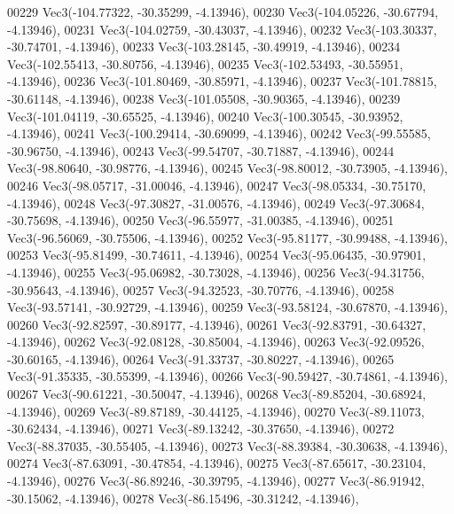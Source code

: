 \begin{DoxyCode}
00229         Vec3(-104.77322, -30.35299, -4.13946),
00230         Vec3(-104.05226, -30.67794, -4.13946),
00231         Vec3(-104.02759, -30.43037, -4.13946),
00232         Vec3(-103.30337, -30.74701, -4.13946),
00233         Vec3(-103.28145, -30.49919, -4.13946),
00234         Vec3(-102.55413, -30.80756, -4.13946),
00235         Vec3(-102.53493, -30.55951, -4.13946),
00236         Vec3(-101.80469, -30.85971, -4.13946),
00237         Vec3(-101.78815, -30.61148, -4.13946),
00238         Vec3(-101.05508, -30.90365, -4.13946),
00239         Vec3(-101.04119, -30.65525, -4.13946),
00240         Vec3(-100.30545, -30.93952, -4.13946),
00241         Vec3(-100.29414, -30.69099, -4.13946),
00242         Vec3(-99.55585, -30.96750, -4.13946),
00243         Vec3(-99.54707, -30.71887, -4.13946),
00244         Vec3(-98.80640, -30.98776, -4.13946),
00245         Vec3(-98.80012, -30.73905, -4.13946),
00246         Vec3(-98.05717, -31.00046, -4.13946),
00247         Vec3(-98.05334, -30.75170, -4.13946),
00248         Vec3(-97.30827, -31.00576, -4.13946),
00249         Vec3(-97.30684, -30.75698, -4.13946),
00250         Vec3(-96.55977, -31.00385, -4.13946),
00251         Vec3(-96.56069, -30.75506, -4.13946),
00252         Vec3(-95.81177, -30.99488, -4.13946),
00253         Vec3(-95.81499, -30.74611, -4.13946),
00254         Vec3(-95.06435, -30.97901, -4.13946),
00255         Vec3(-95.06982, -30.73028, -4.13946),
00256         Vec3(-94.31756, -30.95643, -4.13946),
00257         Vec3(-94.32523, -30.70776, -4.13946),
00258         Vec3(-93.57141, -30.92729, -4.13946),
00259         Vec3(-93.58124, -30.67870, -4.13946),
00260         Vec3(-92.82597, -30.89177, -4.13946),
00261         Vec3(-92.83791, -30.64327, -4.13946),
00262         Vec3(-92.08128, -30.85004, -4.13946),
00263         Vec3(-92.09526, -30.60165, -4.13946),
00264         Vec3(-91.33737, -30.80227, -4.13946),
00265         Vec3(-91.35335, -30.55399, -4.13946),
00266         Vec3(-90.59427, -30.74861, -4.13946),
00267         Vec3(-90.61221, -30.50047, -4.13946),
00268         Vec3(-89.85204, -30.68924, -4.13946),
00269         Vec3(-89.87189, -30.44125, -4.13946),
00270         Vec3(-89.11073, -30.62434, -4.13946),
00271         Vec3(-89.13242, -30.37650, -4.13946),
00272         Vec3(-88.37035, -30.55405, -4.13946),
00273         Vec3(-88.39384, -30.30638, -4.13946),
00274         Vec3(-87.63091, -30.47854, -4.13946),
00275         Vec3(-87.65617, -30.23104, -4.13946),
00276         Vec3(-86.89246, -30.39795, -4.13946),
00277         Vec3(-86.91942, -30.15062, -4.13946),
00278         Vec3(-86.15496, -30.31242, -4.13946),

\end{DoxyCode}
